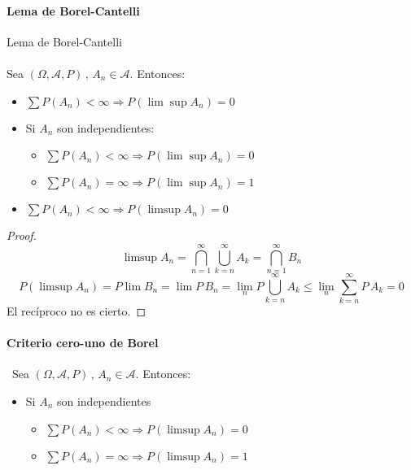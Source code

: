 \paragraph{Lema de Borel-Cantelli}
\begin{lemma}
Lema de Borel-Cantelli
\\\\
Sea $(\Omega,\mathcal{A},P) \, , \, A_n \in \mathcal{A}$. Entonces:
\begin{itemize}
\item $\displaystyle\sum P(A_n) < \infty \Longrightarrow P(\displaystyle \lim \sup A_n)=0$
\item Si $ A_n$ son independientes:
\begin{itemize}
\item $\displaystyle\sum P(A_n) < \infty \Longrightarrow P(\displaystyle \lim \sup A_n)=0$
\item $\displaystyle\sum P(A_n) = \infty \Longrightarrow P(\displaystyle \lim \sup A_n)=1$
\end{itemize}
\item $\displaystyle\sum P(A_n) < \infty \Longrightarrow P(\displaystyle \limsup A_n)=0$
\end{itemize}
\end{lemma}

\begin{proof}
  $$\limsup A_n=\bigcap_{n=1}^\infty \bigcup_{k=n}^{\infty}A_k=\bigcap_{n=1}^\infty B_n$$
  $$P(\limsup A_n)=P\lim B_n=\lim P\, B_n = \lim_n P\bigcup_{k=n}^\infty A_k \leq \lim_n \sum_{k=n}^\infty P\, A_k=0$$
  El recíproco no es cierto.
  

\end{proof}

\paragraph{Criterio cero-uno de Borel}
\begin{criterion} 
  \ 
Sea $(\Omega,\mathcal{A},P) \, , \, A_n \in \mathcal{A}$. Entonces:

\begin{itemize}
\item Si $ A_n$ son independientes 
  \begin{itemize}
  \item $\displaystyle\sum P(A_n) < \infty \Longrightarrow P(\displaystyle \limsup A_n)=0$
  \item $\displaystyle\sum P(A_n) = \infty \Longrightarrow P(\displaystyle \limsup A_n)=1$
  \end{itemize}
\end{itemize}
\end{criterion}

